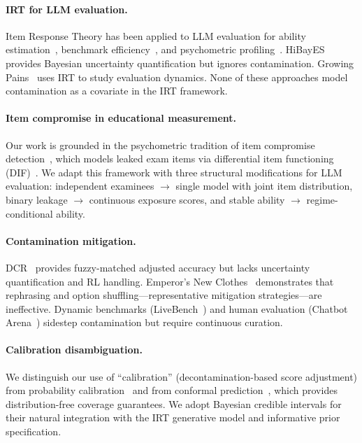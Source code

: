 \documentclass[11pt,a4paper]{article}
\begin{document}
\paragraph{IRT for LLM evaluation.}
Item Response Theory has been applied to LLM evaluation for ability estimation~\citep{lalor2024aaai}, benchmark efficiency~\citep{polo2024tinybenchmarks}, and psychometric profiling~\citep{burnell2023multidimensional}. HiBayES provides Bayesian uncertainty quantification but ignores contamination. Growing Pains~\citep{raju2024growingpains} uses IRT to study evaluation dynamics. None of these approaches model contamination as a covariate in the IRT framework.

\paragraph{Item compromise in educational measurement.}
Our work is grounded in the psychometric tradition of item compromise detection~\citep{eckerly2017detecting, sinharay2017assessment}, which models leaked exam items via differential item functioning (DIF)~\citep{holland1993dif, thissen1993dif, zumbo1999dif}. We adapt this framework with three structural modifications for LLM evaluation: independent examinees $\to$ single model with joint item distribution, binary leakage $\to$ continuous exposure scores, and stable ability $\to$ regime-conditional ability.

\paragraph{Contamination mitigation.}
DCR~\citep{oren2024dcr} provides fuzzy-matched adjusted accuracy but lacks uncertainty quantification and RL handling. Emperor's New Clothes~\citep{empcloths2025} demonstrates that rephrasing and option shuffling---representative mitigation strategies---are ineffective. Dynamic benchmarks (LiveBench~\citep{livebench2024}) and human evaluation (Chatbot Arena~\citep{zheng2023chatbot}) sidestep contamination but require continuous curation.

\paragraph{Calibration disambiguation.}
We distinguish our use of ``calibration'' (decontamination-based score adjustment) from probability calibration~\citep{guo2017calibration, platt1999probabilistic} and from conformal prediction~\citep{angelopoulos2023conformal}, which provides distribution-free coverage guarantees. We adopt Bayesian credible intervals for their natural integration with the IRT generative model and informative prior specification.
\end{document}
